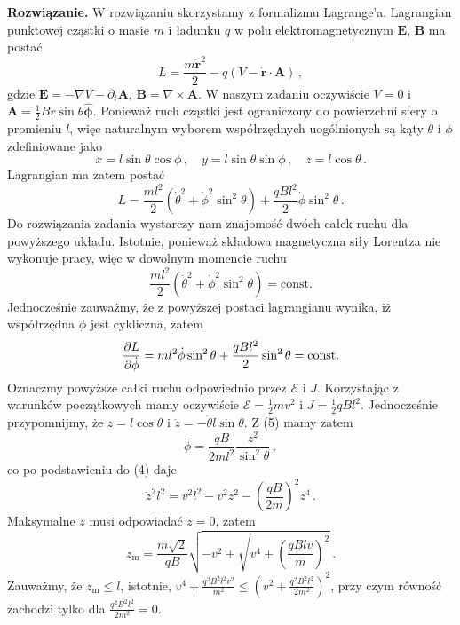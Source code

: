 \documentclass[../main.tex]{subfiles}
\begin{document}
\noindent\textbf{Rozwiązanie.} W rozwiązaniu skorzystamy z formalizmu Lagrange'a. Lagrangian
punktowej cząstki o masie \(m\) i ładunku \(q\) w polu elektromagnetycznym \(\mathbf{E}\),
\(\mathbf{B}\) ma postać
\begin{equation*}
    L=\frac{m\Dot{\mathbf{r}}^2}{2}-q(V-\dot{\mathbf{r}}\cdot\mathbf{A})\,,
\end{equation*}
gdzie \(\mathbf{E}=-\nabla V-\partial_t\mathbf{A}\), \(\mathbf{B}=\nabla\times\mathbf{A}\). W naszym
zadaniu oczywiście \(V=0\) i \(\mathbf{A}=\frac{1}{2}Br\sin\theta\boldsymbol{\hat{\phi}}\). Ponieważ
ruch cząstki jest ograniczony do powierzchni sfery o promieniu \(l\), więc naturalnym wyborem
współrzędnych uogólnionych są kąty \(\theta\) i \(\phi\) zdefiniowane jako
\begin{equation*}
        x=l\sin\theta\cos\phi\,,\quad y=l\sin\theta\sin\phi\,,\quad z=l\cos\theta\,.
\end{equation*}
Lagrangian ma zatem postać
\begin{equation*}
    L=\frac{ml^2}{2}(\dot{\theta}^2+\dot{\phi}^2\sin^2\theta)+\frac{qBl^2}{2}\dot{\phi}\sin^2\theta\,.
\end{equation*}
Do rozwiązania zadania wystarczy nam znajomość dwóch całek ruchu dla powyższego układu. Istotnie,
ponieważ składowa magnetyczna siły Lorentza nie wykonuje pracy, więc w dowolnym momencie ruchu
\begin{equation*}
    \frac{ml^2}{2}(\dot{\theta}^2+\dot{\phi}^2\sin^2\theta)=\text{const.}
\end{equation*}
Jednocześnie zauważmy, że z powyższej postaci lagrangianu wynika, iż współrzędna \(\phi\) jest
cykliczna, zatem
\begin{equation*}
    \pdv{L}{\dot{\phi}}=ml^2\dot{\phi}\sin^2\theta+\frac{qBl^2}{2}\sin^2\theta=\text{const.}
\end{equation*}
Oznaczmy powyższe całki ruchu odpowiednio przez \(\mathscr{E}\) i \(J\). Korzystając z warunków
początkowych mamy oczywiście \(\mathscr{E}=\frac{1}{2}mv^2\) i \(J=\frac{1}{2}qBl^2\). Jednocześnie
przypomnijmy, że \(z=l\cos\theta\) i \(\dot{z}=-\dot{\theta}l\sin\theta\). Z (5) mamy zatem
\begin{equation*}
    \dot{\phi}=\frac{qB}{2ml^2}\frac{z^2}{\sin^2\theta}\,,
\end{equation*}
co po podstawieniu do (4) daje
\begin{equation*}
    \dot{z}^2l^2=v^2l^2-v^2z^2-\left(\frac{qB}{2m}\right)^2z^4\,.
\end{equation*}
Maksymalne \(z\) musi odpowiadać \(\dot{z}=0\), zatem
\begin{equation*}
    z_\text{m}=\frac{m\sqrt{2}}{qB}\sqrt{-v^2+\sqrt{v^4+\left(\frac{qBlv}{m}\right)^2}}\,.
\end{equation*}
Zauważmy, że \(z_\text{m}\leq l\), istotnie,
\(v^4+\frac{q^2B^2l^2v^2}{m^2}\leq(v^2+\frac{q^2B^2l^2}{2m^2})^2\), przy czym równość zachodzi tylko
dla \(\frac{q^2B^2l^2}{2m^2}=0\).
\newpage
\end{document}
